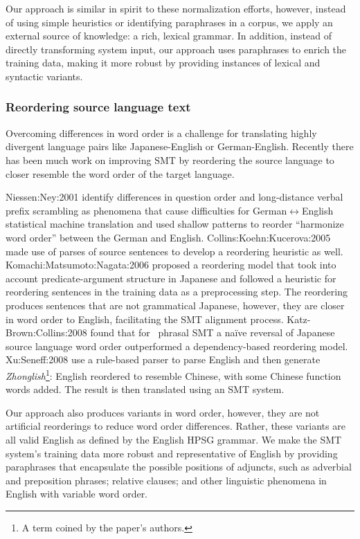\documentclass[english]{jnlp_1.4}
\newcommand{\citet}{}
\newcommand{\JE}{}
\begin{document}
Our approach is similar in spirit to these normalization efforts,
however, instead of using simple heuristics or identifying paraphrases
in a corpus, we apply an external source of knowledge: a rich, lexical
grammar. In addition, instead of directly transforming system input,
our approach uses paraphrases to enrich the training data, making it
more robust by providing instances of lexical and syntactic variants.
 


\subsubsection{Reordering source language text}



Overcoming differences in word order is a challenge for translating
highly divergent language pairs like Japanese-English or
German-English. Recently there has been much work on improving SMT by
reordering the source language to closer resemble the word order of
the target language.


\citet{Niessen:Ney:2001} identify differences in question order and
long-distance verbal prefix scrambling as phenomena that cause
difficulties for German$\leftrightarrow$English statistical machine
translation and used shallow patterns to reorder ``harmonize word
order'' between the German and English.
\citet{Collins:Koehn:Kucerova:2005} made use of parses of source
sentences to develop a reordering heuristic as well.
\citet{Komachi:Matsumoto:Nagata:2006} proposed a reordering model that
took into account predicate-argument structure in Japanese and
followed a heuristic for reordering sentences in the training data as
a preprocessing step. The reordering produces sentences that are not
grammatical Japanese, however, they are closer in word order to
English, facilitating the SMT alignment process.
\citet{Katz-Brown:Collins:2008} found that for \JE~phrasal SMT a
na\"{i}ve reversal of Japanese source language word order outperformed a
dependency-based reordering model. \citet{Xu:Seneff:2008} use a
rule-based parser to parse English and then generate {\it
Zhonglish}\footnote{A term coined by the paper's authors.}: English
reordered to resemble Chinese, with some Chinese function words
added. The result is then translated using an SMT system.

Our approach also produces variants in word order, however, they are
not artificial reorderings to reduce word order differences. Rather,
these variants are all valid English as defined by the English HPSG
grammar. We make the SMT system's training data more robust and
representative of English by providing paraphrases that encapsulate
the possible positions of adjuncts, such as adverbial and preposition
phrases; relative clauses; and other linguistic phenomena in English 
with variable word order.
\end{document}
